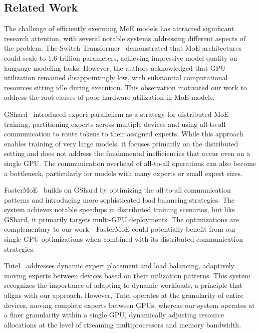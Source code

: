 \documentclass{article}
\begin{document}
\subsection{Related Work}

The challenge of efficiently executing MoE models has attracted significant research attention, with several notable systems addressing different aspects of the problem. The Switch Transformer~\cite{fedus2021switch} demonstrated that MoE architectures could scale to 1.6 trillion parameters, achieving impressive model quality on language modeling tasks. However, the authors acknowledged that GPU utilization remained disappointingly low, with substantial computational resources sitting idle during execution. This observation motivated our work to address the root causes of poor hardware utilization in MoE models.

GShard~\cite{lepikhin2020gshard} introduced expert parallelism as a strategy for distributed MoE training, partitioning experts across multiple devices and using all-to-all communication to route tokens to their assigned experts. While this approach enables training of very large models, it focuses primarily on the distributed setting and does not address the fundamental inefficiencies that occur even on a single GPU. The communication overhead of all-to-all operations can also become a bottleneck, particularly for models with many experts or small expert sizes.

FasterMoE~\cite{he2022fastermoe} builds on GShard by optimizing the all-to-all communication patterns and introducing more sophisticated load balancing strategies. The system achieves notable speedups in distributed training scenarios, but like GShard, it primarily targets multi-GPU deployments. The optimizations are complementary to our work—FasterMoE could potentially benefit from our single-GPU optimizations when combined with its distributed communication strategies.

Tutel~\cite{hwang2023tutel} addresses dynamic expert placement and load balancing, adaptively moving experts between devices based on their utilization patterns. This system recognizes the importance of adapting to dynamic workloads, a principle that aligns with our approach. However, Tutel operates at the granularity of entire devices, moving complete experts between GPUs, whereas our system operates at a finer granularity within a single GPU, dynamically adjusting resource allocations at the level of streaming multiprocessors and memory bandwidth.
\end{document}
